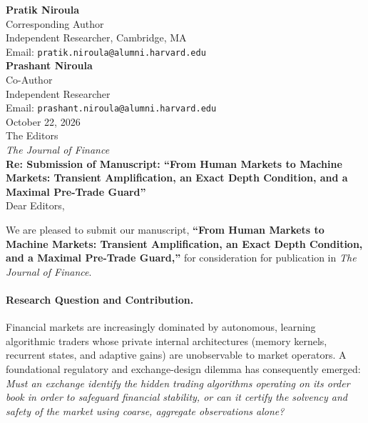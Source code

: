 \documentclass[11pt]{article}
\begin{document}
\thispagestyle{empty}

\noindent
\textbf{Pratik Niroula} \\
Corresponding Author \\
Independent Researcher, Cambridge, MA \\
Email: \texttt{pratik.niroula@alumni.harvard.edu} \\[0.5em]
\textbf{Prashant Niroula} \\
Co-Author \\
Independent Researcher \\
Email: \texttt{prashant.niroula@alumni.harvard.edu} \\[1.5em]

\noindent
October 22, 2026 \\[1.0em]

\noindent
The Editors \\
\textit{The Journal of Finance} \\[1.5em]

\noindent
\textbf{Re: Submission of Manuscript: ``From Human Markets to Machine Markets: Transient Amplification, an Exact Depth Condition, and a Maximal Pre-Trade Guard''} \\[1.0em]

\noindent
Dear Editors,

\vspace{0.5em}
We are pleased to submit our manuscript, \textbf{``From Human Markets to Machine Markets: Transient Amplification, an Exact Depth Condition, and a Maximal Pre-Trade Guard,''} for consideration for publication in \textit{The Journal of Finance}.

\paragraph{Research Question and Contribution.}
Financial markets are increasingly dominated by autonomous, learning algorithmic traders whose private internal architectures (memory kernels, recurrent states, and adaptive gains) are unobservable to market operators. A foundational regulatory and exchange-design dilemma has consequently emerged: \emph{Must an exchange identify the hidden trading algorithms operating on its order book in order to safeguard financial stability, or can it certify the solvency and safety of the market using coarse, aggregate observations alone?}
\end{document}

